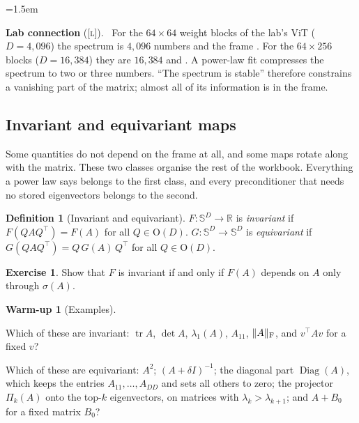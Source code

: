 \documentclass[11pt,a4paper]{article}
\newcommand{\R}{\mathbb{R}}
\newcommand{\Orth}{\mathrm{O}}
\newcommand{\Sym}{\mathbb{S}}
\DeclareMathOperator{\tr}{tr}
\DeclareMathOperator{\Diag}{Diag}
\DeclarePairedDelimiter{\norm}{\lVert}{\rVert}
\newcommand{\F}{\mathrm{F}}
\newcommand{\evL}{\textsc{[l]}}
\theoremstyle{plain}
\theoremstyle{definition}
\newtheorem{definition}[proposition]{Definition}
\newtheorem{warmup}[proposition]{Warm-up}
\newtheorem{exercise}[proposition]{Exercise}
\theoremstyle{remark}
\newenvironment{labbox}{\begin{list}{}{\leftmargin=1.5em\rightmargin=0pt\topsep=6pt}\small\item[]%
  \textcolor{green!35!black}{\textbf{Lab connection} (\evL).}\ }{\end{list}}
\begin{document}
\begin{labbox}
For the $64\times64$ weight blocks of the lab's ViT ($D=4{,}096$) the spectrum is $4{,}096$ numbers and the frame
\NumFrameParamsFourK. For the $64\times256$ blocks ($D=16{,}384$) they are $16{,}384$ and \NumFrameParamsSixteenK.
A power-law fit compresses the spectrum to two or three numbers. ``The spectrum is stable'' therefore constrains a
vanishing part of the matrix; almost all of its information is in the frame.
\end{labbox}

\subsection{Invariant and equivariant maps}

Some quantities do not depend on the frame at all, and some maps rotate along with the matrix. These two classes
organise the rest of the workbook. Everything a power law says belongs to the first class, and every preconditioner
that needs no stored eigenvectors belongs to the second.

\begin{definition}[Invariant and equivariant]\label{def:invariant}
$F:\Sym^D\to\R$ is \emph{invariant} if $F(QAQ^\top)=F(A)$ for all $Q\in\Orth(D)$. $G:\Sym^D\to\Sym^D$ is
\emph{equivariant} if $G(QAQ^\top)=Q\,G(A)\,Q^\top$ for all $Q\in\Orth(D)$.
\end{definition}

\begin{exercise}\label{ex:invariant}
Show that $F$ is invariant if and only if $F(A)$ depends on $A$ only through $\sigma(A)$.
\end{exercise}

\begin{warmup}[Examples]\label{wu:examples}
\begin{steps}
\item Which of these are invariant: $\tr A$, $\det A$, $\lambda_1(A)$, $A_{11}$, $\norm{A}_\F$, and $v^\top Av$ for
  a fixed $v$?
\item Which of these are equivariant: $A^2$; $(A+\delta I)^{-1}$; the diagonal part $\Diag(A)$, which keeps the
  entries $A_{11},\dots,A_{DD}$ and sets all others to zero; the projector $\Pi_k(A)$ onto the top-$k$ eigenvectors,
  on matrices with $\lambda_k>\lambda_{k+1}$; and $A+B_0$ for a fixed matrix $B_0$?
\end{steps}
\end{warmup}
\end{document}
